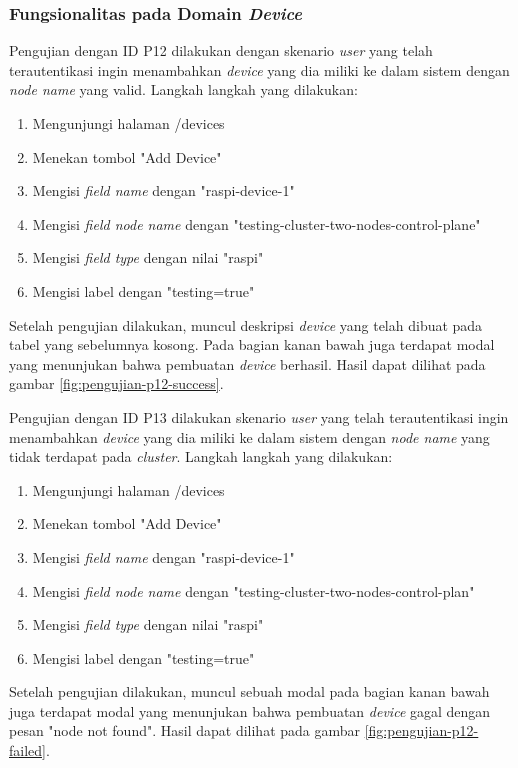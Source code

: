 \subsubsection{Fungsionalitas pada Domain \textit{Device}}

Pengujian dengan ID P12 dilakukan dengan skenario \textit{user} yang telah terautentikasi ingin menambahkan \textit{device} yang dia miliki ke dalam sistem dengan \textit{node name} yang valid. Langkah langkah yang dilakukan:
\begin{enumerate}
  \item Mengunjungi halaman /devices
  \item Menekan tombol "Add Device"
  \item Mengisi \textit{field name} dengan "raspi-device-1"
  \item Mengisi \textit{field node name} dengan "testing-cluster-two-nodes-control-plane"
  \item Mengisi \textit{field type} dengan nilai "raspi"
  \item Mengisi label dengan "testing=true"
\end{enumerate}

Setelah pengujian dilakukan, muncul deskripsi \textit{device} yang telah dibuat pada tabel yang sebelumnya kosong. Pada bagian kanan bawah juga terdapat modal yang menunjukan bahwa pembuatan \textit{device} berhasil. Hasil dapat dilihat pada gambar \ref{fig:pengujian-p12-success}.

Pengujian dengan ID P13 dilakukan skenario \textit{user} yang telah terautentikasi ingin menambahkan \textit{device} yang dia miliki ke dalam sistem dengan \textit{node name} yang tidak terdapat pada \textit{cluster}. Langkah langkah yang dilakukan:
\begin{enumerate}
  \item Mengunjungi halaman /devices
  \item Menekan tombol "Add Device"
  \item Mengisi \textit{field name} dengan "raspi-device-1"
  \item Mengisi \textit{field node name} dengan "testing-cluster-two-nodes-control-plan"
  \item Mengisi \textit{field type} dengan nilai "raspi"
  \item Mengisi label dengan "testing=true"
\end{enumerate}

Setelah pengujian dilakukan, muncul sebuah modal pada bagian kanan bawah juga terdapat modal yang menunjukan bahwa pembuatan \textit{device} gagal dengan pesan "node not found". Hasil dapat dilihat pada gambar \ref{fig:pengujian-p12-failed}.

